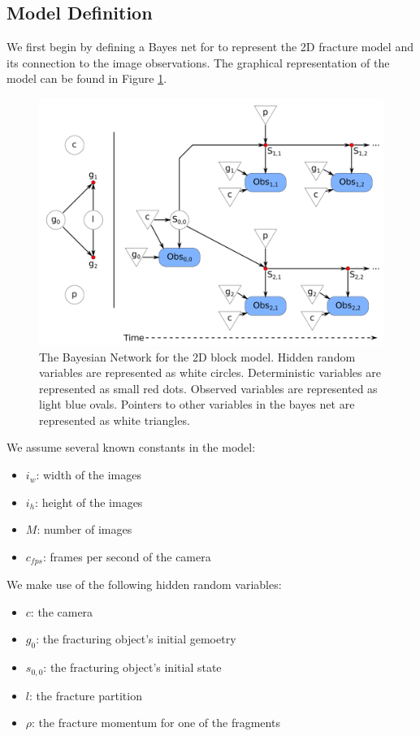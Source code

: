 \documentclass[runningheads]{llncs}
\begin{document}
\subsection{Model Definition}
\label{model-definition}

We first begin by defining a Bayes net for to represent the 2D fracture model and 
its connection to the image observations. The graphical representation of the 
model can be found in Figure \ref{fig:bayes-net}.

\begin{figure}[t]
\begin{center}
   \includegraphics[width=0.8\linewidth]{figs/bayes-net.png}
\end{center}
   \caption{The Bayesian Network for the 2D block model. Hidden random variables 
        are represented as white circles. Deterministic variables are 
        represented as small red dots. Observed variables are represented as 
        light blue ovals. Pointers to other variables in the bayes net are 
        represented as white triangles.}
\label{fig:bayes-net}
\end{figure}

We assume several known constants in the model:

\begin{itemize}
    \item $i_w$: width of the images
    \item $i_h$: height of the images
    \item $M$: number of images
    \item $c_{fps}$: frames per second of the camera
\end{itemize}

We make use of the following hidden random variables:

\begin{itemize}
    \item $c$: the camera
    \item $g_0$: the fracturing object's initial gemoetry
    \item $s_{0,0}$: the fracturing object's initial state
    \item $l$: the fracture partition
    \item $\rho$: the fracture momentum for one of the fragments
\end{itemize}
\end{document}

